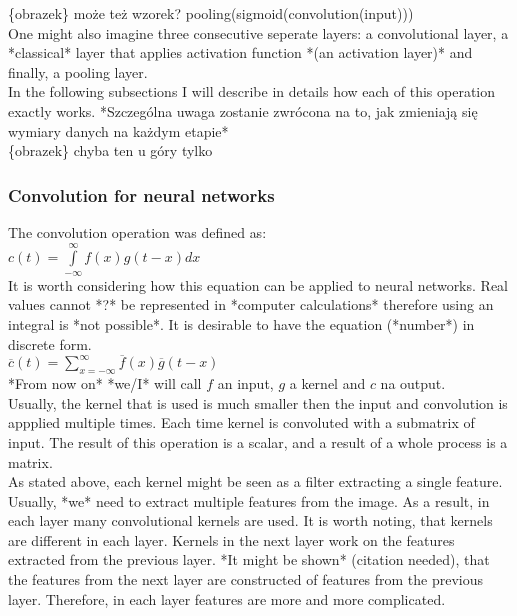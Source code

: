 \documentclass[a4paper,10pt]{report}
\begin{document}
	\{obrazek\}  może też wzorek? pooling(sigmoid(convolution(input))) \\
	
	One might also imagine three consecutive seperate layers: a convolutional layer, a *classical* layer that applies activation function *(an activation layer)* and finally, a pooling layer.\\
	
	In the following subsections I will describe in details how each of this operation exactly works. *Szczególna uwaga zostanie zwrócona na to, jak zmieniają się wymiary danych na każdym etapie*\\
	
	\{obrazek\} chyba ten u góry tylko
	
	\subsubsection{Convolution for neural networks}%
	  The convolution operation was defined as: \\
	  
	  $c(t) = \int\limits_{-\infty}^\infty f(x)g(t-x)dx$ \\
	  
	  It is worth considering how this equation can be applied to neural networks. Real values cannot *?* be represented in *computer calculations* therefore using an integral is *not possible*. It is desirable to have the equation (*number*) in discrete form.\\
	  
	  $\overline{c}(t) = \sum\limits_{x = -\infty}^\infty \overline{f}(x)\overline{g}(t-x)$ \\%
	  
	  *From now on* *we/I* will call $f$ an input, $g$ a kernel and $c$ na output.\\
	  
	  Usually, the kernel that is used is much smaller then the input and convolution is appplied multiple times. Each time kernel is convoluted with a submatrix of input. The result of this operation is a scalar, and a result of a whole process is a matrix.\\
	  
	  As stated above, each kernel might be seen as a filter extracting a single feature. Usually, *we* need to extract multiple features from the image. As a result, in each layer many convolutional kernels are used. It is worth noting, that kernels are different in each layer. Kernels in the next layer work on the features extracted from the previous layer. *It might be shown* (citation needed), that the features from the next layer are constructed of features from the previous layer. Therefore, in each layer features are more and more complicated.\\
	  
\end{document}

